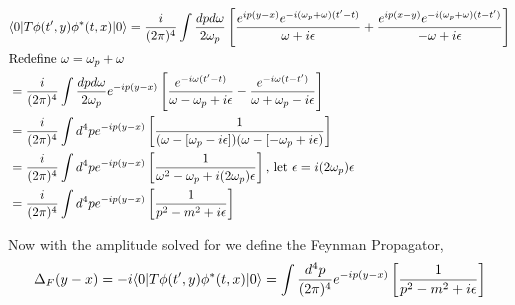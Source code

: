 \documentclass{article}
\numberwithin{equation}{section}
\newcommand{\beq}{\begin{equation}}
\newcommand{\eeq}{\end{equation}}
\begin{document}
\beq \begin{split}
    &\bracket{0}{T\phi(t',y)\phi^*(t,x)}{0} = \frac{i}{(2\pi)^4} \int \frac{dp d\omega}{2\omega_p} \left[ \frac{e^{ip(y-x)}e^{-i(\omega_p + \omega)(t'-t)} }{\omega + i\epsilon} + \frac{e^{ip(x-y)}e^{-i(\omega_p + \omega)(t-t')}}{-\omega + i\epsilon}     \right] \\ 
    & \text{Redefine } \omega = \omega_p + \omega \\
    & =  \frac{i}{(2\pi)^4} \int \frac{dp d\omega}{2\omega_p} e^{-ip(y-x)}\left[ \frac{e^{-i\omega(t'-t)} }{\omega - \omega_p + i\epsilon} - \frac{e^{-i\omega(t-t')}}{\omega + \omega_p - i\epsilon}     \right] \\
    &= \frac{i}{(2\pi)^4} \int d^4p e^{-ip(y-x)} \left[ \frac{1}{(\omega - [\omega_p -i\epsilon])(\omega - [-\omega_p +i\epsilon)}    \right] \\
    &=\frac{i}{(2\pi)^4} \int d^4p e^{-ip(y-x)} \left[  \frac{1}{\omega^2 - \omega_p + i(2\omega_p)\epsilon}\right] \text{, let } \epsilon = i(2\omega_p)\epsilon  \\
    &=\frac{i}{(2\pi)^4} \int d^4p e^{-ip(y-x)} \left[  \frac{1}{p^2-m^2 + i\epsilon}\right] \\
\end{split} \eeq  

Now with the amplitude solved for we define the Feynman Propagator,
\beq
    \Delta_F(y-x) = -i \bracket{0}{T\phi(t',y)\phi^*(t,x)}{0} =\int \frac{d^4p}{(2\pi)^4} e^{-ip(y-x)} \left[  \frac{1}{p^2-m^2 + i\epsilon}\right]
\eeq
\end{document}
